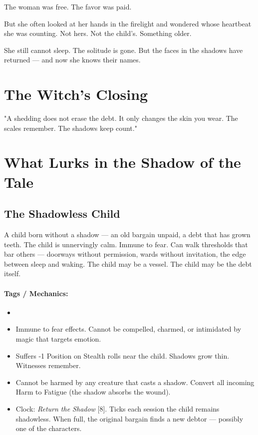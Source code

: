 The woman was free. The favor was paid.

But she often looked at her hands in the firelight and wondered whose heartbeat she was counting. Not hers. Not the child's. Something older.

She still cannot sleep. The solitude is gone. But the faces in the shadows have returned — and now she knows their names.

\section*{The Witch's Closing}
"A shedding does not erase the debt. It only changes the skin you wear. The scales remember. The shadows keep count."

\section*{What Lurks in the Shadow of the Tale}

\subsection*{The Shadowless Child}

A child born without a shadow — an old bargain unpaid, a debt that has grown teeth. The child is unnervingly calm. Immune to fear. Can walk thresholds that bar others — doorways without permission, wards without invitation, the edge between sleep and waking. The child may be a vessel. The child may be the debt itself.

\paragraph{Tags / Mechanics:}
\begin{itemize}
\item [THRESHOLD] [DREAD] [MARK]
\item Immune to fear effects. Cannot be compelled, charmed, or intimidated by magic that targets emotion.
\item Suffers -1 Position on Stealth rolls near the child. Shadows grow thin. Witnesses remember.
\item Cannot be harmed by any creature that casts a shadow. Convert all incoming Harm to Fatigue (the shadow absorbs the wound).
\item Clock: \textit{Return the Shadow} [8]. Ticks each session the child remains shadowless. When full, the original bargain finds a new debtor — possibly one of the characters.
\end{itemize}

